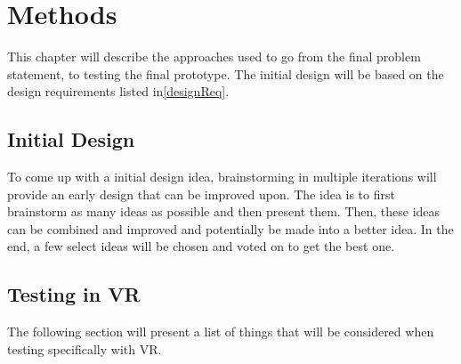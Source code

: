 \chapter{Methods}\label{chap:methods}
    This chapter will describe the approaches used to go from the final problem statement, to testing the final prototype. The initial design will be based on the design requirements listed in\autoref{designReq}.
    
    \section{Initial Design}
    To come up with a initial design idea, brainstorming in multiple iterations will provide an early design that can be improved upon. The idea is to first brainstorm as many ideas as possible and then present them. Then, these ideas can be combined and improved and potentially be made into a better idea. In the end, a few select ideas will be chosen and voted on to get the best one.

    \section{Testing in VR}
    The following section will present a list of things that will be considered when testing specifically with VR.\\
    
